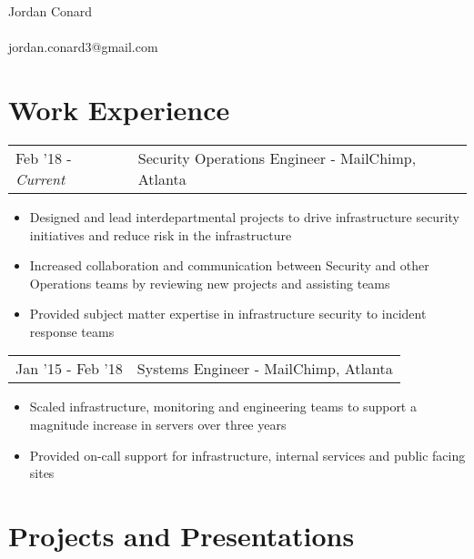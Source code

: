 \documentclass[letterpaper]{article}
\begin{document}
\pagestyle{empty} %


\begin{center}
    {\Huge Jordan Conard}\\~\\
    jordan.conard3@gmail.com\\
\end{center}

\section*{Work Experience}
\begin{tabular}{l|l}
{Feb '18 - \emph{Current}} & Security Operations Engineer - MailChimp, Atlanta
\end{tabular}
\begin{itemize}[noitemsep]
	\item Designed and lead interdepartmental projects to drive infrastructure security initiatives and reduce risk in the infrastructure
	\item Increased collaboration and communication between Security and other Operations teams by reviewing new projects and assisting teams
	\item Provided subject matter expertise in infrastructure security to incident response teams
\end{itemize}
\begin{tabular}{l|l}
{Jan '15 - Feb '18} & Systems Engineer - MailChimp, Atlanta\\
\end{tabular}
\begin{itemize}[noitemsep]
	\item Scaled infrastructure, monitoring and engineering teams to support a magnitude increase in servers over three years
	\item Provided on-call support for infrastructure, internal services and public facing sites
\end{itemize}

\section*{Projects and Presentations}
\end{document}
